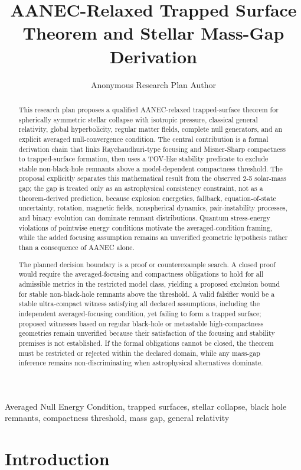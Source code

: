\documentclass[conference]{IEEEtran}
\begin{document}
\title{AANEC-Relaxed Trapped Surface Theorem and Stellar Mass-Gap Derivation}\author{Anonymous Research Plan Author}\maketitle

\begin{abstract}
This research plan proposes a qualified AANEC-relaxed trapped-surface theorem for spherically symmetric stellar collapse with isotropic pressure, classical general relativity, global hyperbolicity, regular matter fields, complete null generators, and an explicit averaged null-convergence condition. The central contribution is a formal derivation chain that links Raychaudhuri-type focusing and Misner-Sharp compactness to trapped-surface formation, then uses a TOV-like stability predicate to exclude stable non-black-hole remnants above a model-dependent compactness threshold. The proposal explicitly separates this mathematical result from the observed 2-5 solar-mass gap; the gap is treated only as an astrophysical consistency constraint, not as a theorem-derived prediction, because explosion energetics, fallback, equation-of-state uncertainty, rotation, magnetic fields, nonspherical dynamics, pair-instability processes, and binary evolution can dominate remnant distributions. Quantum stress-energy violations of pointwise energy conditions motivate the averaged-condition framing, while the added focusing assumption remains an unverified geometric hypothesis rather than a consequence of AANEC alone.

The planned decision boundary is a proof or counterexample search. A closed proof would require the averaged-focusing and compactness obligations to hold for all admissible metrics in the restricted model class, yielding a proposed exclusion bound for stable non-black-hole remnants above the threshold. A valid falsifier would be a stable ultra-compact witness satisfying all declared assumptions, including the independent averaged-focusing condition, yet failing to form a trapped surface; proposed witnesses based on regular black-hole or metastable high-compactness geometries remain unverified because their satisfaction of the focusing and stability premises is not established. If the formal obligations cannot be closed, the theorem must be restricted or rejected within the declared domain, while any mass-gap inference remains non-discriminating when astrophysical alternatives dominate.
\end{abstract}
\begin{IEEEkeywords}
Averaged Null Energy Condition, trapped surfaces, stellar collapse, black hole remnants, compactness threshold, mass gap, general relativity
\end{IEEEkeywords}\section{Introduction}
\end{document}
